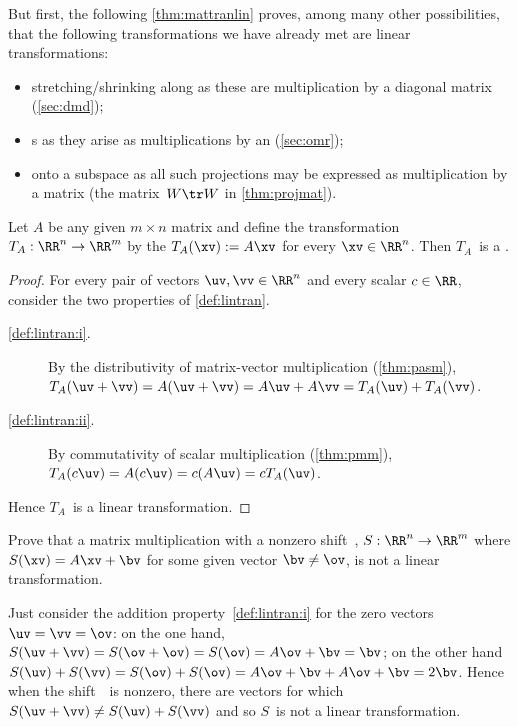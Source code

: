 \begin{example} 
But first, the following \cref{thm:mattranlin} proves, among many other possibilities, that the following transformations we have already met are linear transformations:
\begin{itemize}
\item stretching\slash shrinking along  as these are multiplication by a diagonal matrix (\cref{sec:dmd});
\item {}s as they arise as multiplications by an  (\cref{sec:omr});
\item {} onto a subspace as all such projections may be expressed as multiplication by a matrix (the matrix~\(W\tr W\) in \cref{thm:projmat}).
\end{itemize}
\end{example}


\begin{theorem} \label{thm:mattranlin} 
Let \(A\) be any given \(m\times n\) matrix and define the transformation \(T_A:\RR^n\to\RR^m\)  by the  \(T_A(\xv):=A\xv\) for every \(\xv\in\RR^n\). 
Then \(T_A\)~is a .
\end{theorem}
\begin{proof} 
For every pair of vectors \(\uv,\vv\in\RR^n\) and every scalar \(c\in\RR\), consider the two properties of \cref{def:lintran}.
\begin{description}
\item[\ref{def:lintran:i}.] By the distributivity of matrix-vector multiplication (\cref{thm:pasm}), \(T_A(\uv+\vv)=A(\uv+\vv)=A\uv+A\vv=T_A(\uv)+T_A(\vv)\).
\item[\ref{def:lintran:ii}.] By commutativity of scalar multiplication (\cref{thm:pmm}), \(T_A(c\uv)=A(c\uv)=c(A\uv)=cT_A(\uv)\).
\end{description}
Hence \(T_A\)~is a linear transformation.
\end{proof}



\begin{example} 
Prove that a matrix multiplication with a nonzero shift~\bv, \(S:\RR^n\to\RR^m\) where \(S(\xv)=A\xv+\bv\) for some given vector \(\bv\neq\ov\), is not a linear transformation.
\begin{solution} 
Just consider the addition property~\ref{def:lintran:i} for the zero vectors \(\uv=\vv=\ov\):  
on the one hand, \(S(\uv+\vv)=S(\ov+\ov)=S(\ov)=A\ov+\bv=\bv\); 
on the other hand \(S(\uv)+S(\vv)=S(\ov)+S(\ov)=A\ov+\bv+A\ov+\bv=2\bv\).  
Hence when the shift~\bv\ is nonzero, there are vectors for which \(S(\uv+\vv)\neq S(\uv)+S(\vv)\) and so \(S\)~is not a linear transformation.
\end{solution}
\end{example}



